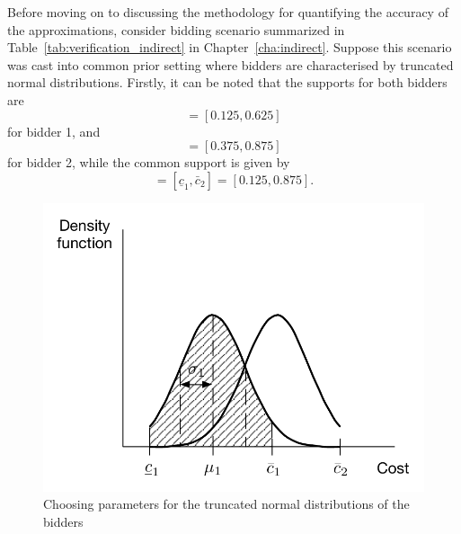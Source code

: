Before moving on to discussing the methodology for quantifying the accuracy of the approximations, consider bidding scenario summarized in Table~\ref{tab:verification_indirect} in Chapter~\ref{cha:indirect}. Suppose this scenario was cast into common prior setting where bidders are characterised by truncated normal distributions. Firstly, it can be noted that the supports for both bidders are
\begin{equation}
  [\underline{c}_1, \bar{c}_1] = [0.125, 0.625]
\end{equation}
for bidder 1, and
\begin{equation}
  [\underline{c}_2, \bar{c}_2] = [0.375, 0.875]
\end{equation}
for bidder 2, while the common support is given by
\begin{equation}
  [\underline{c},\bar{c}] = [\underline{c}_1, \bar{c}_2] = [0.125, 0.875].
\end{equation}

\begin{figure}[t]
  \includegraphics[width=\figsize]{Approximation/Figures/modelling_params}
  \caption{Choosing parameters for the truncated normal distributions of the bidders}
  \label{fig:modelling_params_approximation}
\end{figure}

